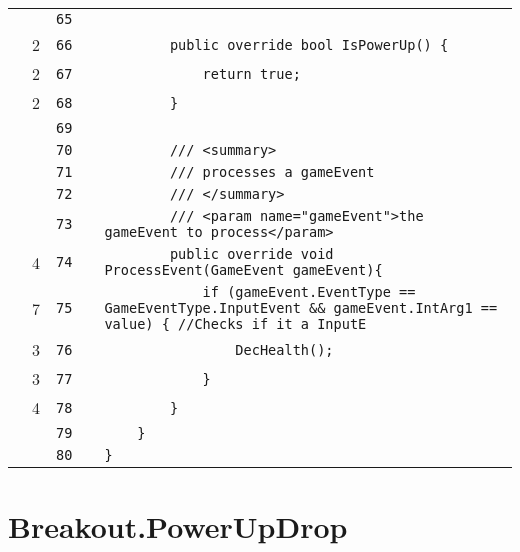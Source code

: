 \documentclass[a4paper,landscape,10pt]{article}
\begin{document}
\begin{longtable}[l]{lrrll}
\cellcolor{gray} &  & \verb~65~ & & \verb~~\\
\cellcolor{green} & 2 & \verb~66~ & & \verb~        public override bool IsPowerUp() {~\\
\cellcolor{green} & 2 & \verb~67~ & & \verb~            return true;~\\
\cellcolor{green} & 2 & \verb~68~ & & \verb~        }~\\
\cellcolor{gray} &  & \verb~69~ & & \verb~~\\
\cellcolor{gray} &  & \verb~70~ & & \verb~        /// <summary>~\\
\cellcolor{gray} &  & \verb~71~ & & \verb~        /// processes a gameEvent~\\
\cellcolor{gray} &  & \verb~72~ & & \verb~        /// </summary>~\\
\cellcolor{gray} &  & \verb~73~ & & \verb~        /// <param name="gameEvent">the gameEvent to process</param>~\\
\cellcolor{green} & 4 & \verb~74~ & & \verb~        public override void ProcessEvent(GameEvent gameEvent){~\\
\cellcolor{orange} & 7 & \verb~75~ & & \verb~            if (gameEvent.EventType == GameEventType.InputEvent && gameEvent.IntArg1 == value) { //Checks if it a InputE~\\
\cellcolor{green} & 3 & \verb~76~ & & \verb~                DecHealth();~\\
\cellcolor{green} & 3 & \verb~77~ & & \verb~            }~\\
\cellcolor{green} & 4 & \verb~78~ & & \verb~        }~\\
\cellcolor{gray} &  & \verb~79~ & & \verb~    }~\\
\cellcolor{gray} &  & \verb~80~ & & \verb~}~\\
\end{longtable}
\newpage
\section{Breakout.PowerUpDrop}
\end{document}
